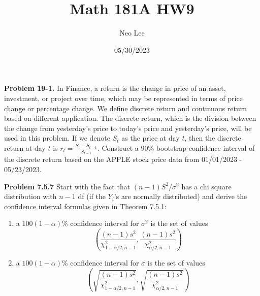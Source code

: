 \documentclass{article}
\title{Math 181A HW9}
\author{Neo Lee}
\date{05/30/2023}
\begin{document}
 

\maketitle 

\textbf{Problem 19-1.}
In Finance, a return is the change in price of an asset, investment, or project over time, which may be represented in terms of price change or percentage change. 
We define discrete return and continuous return based on different application. 
The discrete return, which is the division between the change from yesterday's price to today's price and yesterday's price, will be used in this problem. 
If we denote $S_t$ as the price at day $t$, then the discrete return at day $t$ is $r_t = \frac{S_t-S_{t-1}}{S_{t-1}}$. 
Construct a 90\% bootstrap confidence interval of the discrete return based on the APPLE stock price data from 01/01/2023 - 05/23/2023.



\textbf{Problem 7.5.7}
Start with the fact that $(n - 1)S^2/\sigma^2$ has a chi square distribution with $n - 1$ df (if the $Y_i$'s are normally distributed) and derive the confidence interval formulas given in Theorem 7.5.1:
\begin{enumerate}[label=(\alph*)]
    \item 
    a $100(1-\alpha)\%$ confidence interval for $\sigma^2$ is the set of values $$\left(\frac{(n-1)s^2}{\chi^2_{1-\alpha/2, n-1}}, \frac{(n-1)s^2}{\chi^2_{\alpha/2, n-1}}\right)$$
    
    \item
    a $100(1-\alpha)\%$ confidence interval for $\sigma$ is the set of values $$\left(\sqrt{\frac{(n-1)s^2}{\chi^2_{1-\alpha/2, n-1}}}, \sqrt{\frac{(n-1)s^2}{\chi^2_{\alpha/2, n-1}}}\right)$$
\end{enumerate}
\bigbreak
\end{document}
